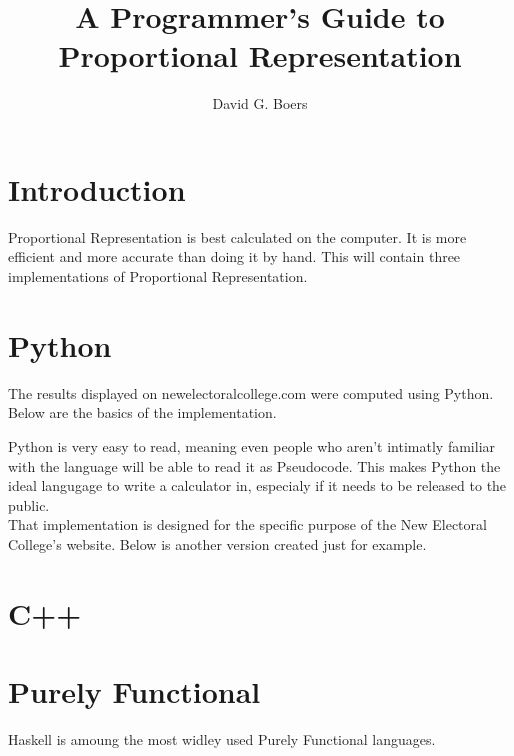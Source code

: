 \documentclass{article}
\title{A Programmer's Guide to Proportional Representation}
\author{David G. Boers}
\begin{document}
    \maketitle
    
    \section{Introduction}

    Proportional Representation is best calculated on the computer. It is more efficient and more accurate than doing it by hand. This will contain three implementations of Proportional Representation.

    \section{Python}

    The results displayed on newelectoralcollege.com were computed using Python. Below are the basics of the implementation.

    

    Python is very easy to read, meaning even people who aren't intimatly familiar with the language will be able to read it as Pseudocode. This makes Python the ideal langugage to write a calculator in, especialy if it needs to be released to the public.\\

    That implementation is designed for the specific purpose of the New Electoral College's website. Below is another version created just for example.

    

    \section{C++}

    

    \section{Purely Functional}

    Haskell is amoung the most widley used Purely Functional languages.

    
\end{document}
